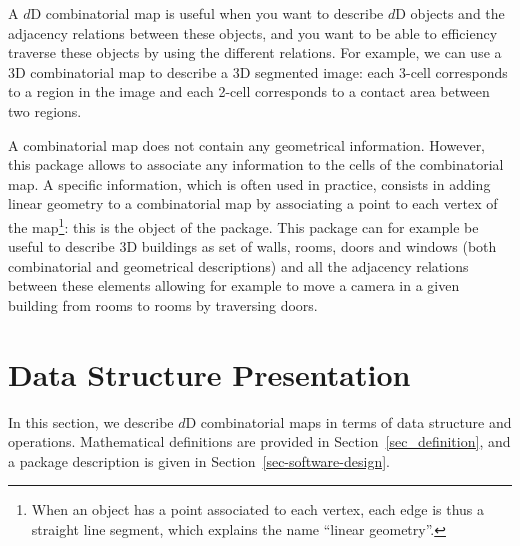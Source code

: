 A $d$D combinatorial map is useful when you want to describe $d$D
objects and the adjacency relations between these objects, and you
want to be able to efficiency traverse these objects by using the
different relations.  For example, we can use a 3D combinatorial map
to describe a 3D segmented image: each 3-cell corresponds to a region
in the image and each 2-cell corresponds to a contact area between two
regions.

A combinatorial map does not contain any geometrical
information. However, this package allows to associate any information
to the cells of the combinatorial map. A specific information, which
is often used in practice, consists in adding linear geometry to a
combinatorial map by associating a point to each vertex of the
map\footnote{When an object has a point associated to each vertex,
  each edge is thus a straight line segment, which explains the name
  ``linear geometry''.}: this is the object of the
 package. This package can for example be
useful to describe 3D buildings as set of walls, rooms, doors and
windows (both combinatorial and geometrical descriptions) and all the
adjacency relations between these elements allowing for example to
move a camera in a given building from rooms to rooms by traversing
doors.


\section{Data Structure Presentation}\label{sec_presentation}
In this section, we describe $d$D combinatorial maps in terms of data
structure and operations. Mathematical definitions are provided in
Section~\ref{sec_definition}, and a package description is given in
Section~\ref{sec-software-design}.

